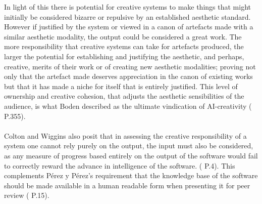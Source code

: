 \documentclass[letterpaper]{article}
\begin{document}
In light of this there is potential for creative systems to make things that might initially be considered bizarre or repulsive by an established aesthetic standard. However if justified by the system or viewed in a canon of artefacts made with a similar aesthetic modality, the output could be considered a great work. The more responsibility that creative systems can take for artefacts produced, the larger the potential for establishing and justifying the aesthetic, and  perhaps, creative, merits of their work or of creating new aesthetic modalities; proving not only that the artefact made deserves appreciation in the canon of existing works but that it has made a niche for itself that is entirely justified. This level of ownership and creative cohesion, that adjusts the aesthetic sensibilities of the audience, is what Boden described as the ultimate vindication of AI-creativity ( P.355).\\
\\Colton and Wiggins also posit that in assessing the creative responsibility of a system one cannot rely purely on the output, the input must also be considered, as any measure of progress based entirely on the output of the software would fail to correctly reward the advance in intelligence of the software. ( P.4). This complements P\'erez y P\'erez's requirement that the knowledge base of the software should be made available in a human readable form when presenting it for peer review ( P.15).\\%





\end{document}
